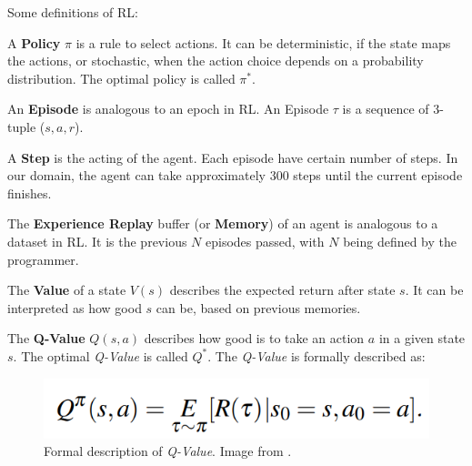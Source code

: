 Some definitions of RL:

\begin{defn}A \textbf{Policy} $\pi$ is a rule to select actions. It can be deterministic, if the state maps the actions, or stochastic,  when the action choice depends on a probability distribution. The optimal policy is called $\pi^*$. \end{defn}

\begin{defn}An \textbf{Episode} is analogous to an epoch in RL. An Episode $\tau$ is a sequence of 3-tuple ($s, a, r$). \end{defn}

\begin{defn}A \textbf{Step} is the acting of the agent. Each episode have certain number of steps. In our domain, the agent can take approximately 300 steps until the current episode finishes.\end{defn}

\begin{defn}The \textbf{Experience Replay} buffer (or \textbf{Memory}) of an agent is analogous to a dataset in RL. It is the previous $N$ episodes passed, with $N$ being defined by the programmer.\end{defn}

\begin{defn}The \textbf{Value} of a state $V(s)$ describes the expected return after state $s$. It can be interpreted as how good $s$ can be, based on previous memories.\end{defn}

\begin{defn}The \textbf{Q-Value} $Q(s, a)$ describes how good is to take an action $a$ in a given state $s$. The optimal \textit{Q-Value} is called $Q^*$. The \textit{Q-Value} is formally described as:
    \begin{figure}[H]
        \centering
        \includegraphics[scale=0.35]{images/qvalue.png}
        \caption{Formal description of \textit{Q-Value}. Image from \cite{tgze}.}
        \label{fig:qvalue}
    \end{figure}
\end{defn}

